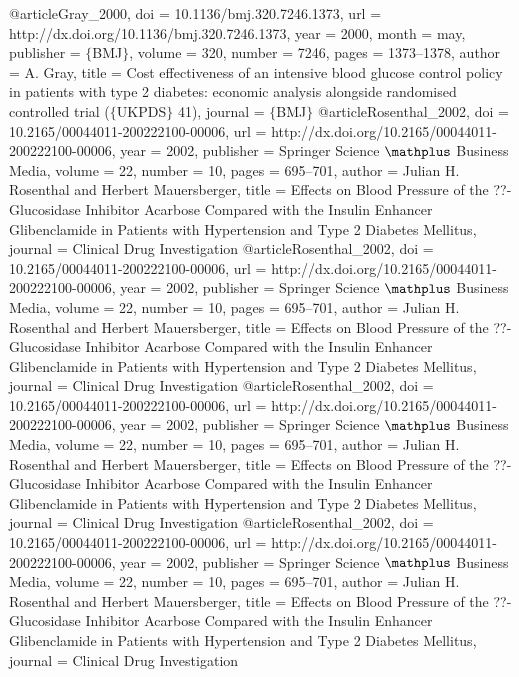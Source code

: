 @article{Gray_2000,
	doi = {10.1136/bmj.320.7246.1373},
	url = {http://dx.doi.org/10.1136/bmj.320.7246.1373},
	year = 2000,
	month = {may},
	publisher = {$\lbrace$BMJ$\rbrace$},
	volume = {320},
	number = {7246},
	pages = {1373--1378},
	author = {A. Gray},
	title = {Cost effectiveness of an intensive blood glucose control policy in patients with type 2 diabetes: economic analysis alongside randomised controlled trial ($\lbrace$UKPDS$\rbrace$ 41)},
	journal = {$\lbrace$BMJ$\rbrace$}
}
@article{Rosenthal_2002,
	doi = {10.2165/00044011-200222100-00006},
	url = {http://dx.doi.org/10.2165/00044011-200222100-00006},
	year = 2002,
	publisher = {Springer Science $\mathplus$ Business Media},
	volume = {22},
	number = {10},
	pages = {695--701},
	author = {Julian H. Rosenthal and Herbert Mauersberger},
	title = {Effects on Blood Pressure of the ??-Glucosidase Inhibitor Acarbose Compared with the Insulin Enhancer Glibenclamide in Patients with Hypertension and Type 2 Diabetes Mellitus},
	journal = {Clinical Drug Investigation}
}
@article{Rosenthal_2002,
	doi = {10.2165/00044011-200222100-00006},
	url = {http://dx.doi.org/10.2165/00044011-200222100-00006},
	year = 2002,
	publisher = {Springer Science $\mathplus$ Business Media},
	volume = {22},
	number = {10},
	pages = {695--701},
	author = {Julian H. Rosenthal and Herbert Mauersberger},
	title = {Effects on Blood Pressure of the ??-Glucosidase Inhibitor Acarbose Compared with the Insulin Enhancer Glibenclamide in Patients with Hypertension and Type 2 Diabetes Mellitus},
	journal = {Clinical Drug Investigation}
}
@article{Rosenthal_2002,
	doi = {10.2165/00044011-200222100-00006},
	url = {http://dx.doi.org/10.2165/00044011-200222100-00006},
	year = 2002,
	publisher = {Springer Science $\mathplus$ Business Media},
	volume = {22},
	number = {10},
	pages = {695--701},
	author = {Julian H. Rosenthal and Herbert Mauersberger},
	title = {Effects on Blood Pressure of the ??-Glucosidase Inhibitor Acarbose Compared with the Insulin Enhancer Glibenclamide in Patients with Hypertension and Type 2 Diabetes Mellitus},
	journal = {Clinical Drug Investigation}
}
@article{Rosenthal_2002,
	doi = {10.2165/00044011-200222100-00006},
	url = {http://dx.doi.org/10.2165/00044011-200222100-00006},
	year = 2002,
	publisher = {Springer Science $\mathplus$ Business Media},
	volume = {22},
	number = {10},
	pages = {695--701},
	author = {Julian H. Rosenthal and Herbert Mauersberger},
	title = {Effects on Blood Pressure of the ??-Glucosidase Inhibitor Acarbose Compared with the Insulin Enhancer Glibenclamide in Patients with Hypertension and Type 2 Diabetes Mellitus},
	journal = {Clinical Drug Investigation}
}
